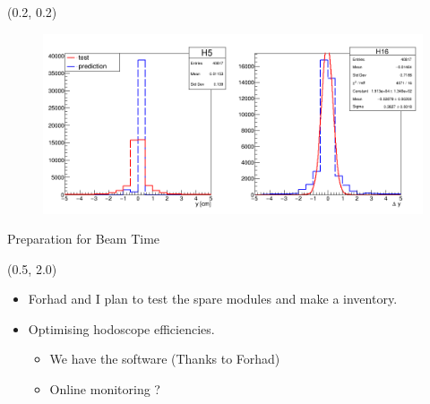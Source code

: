 \documentclass[12pt, xcolor={dvipsnames}, aspectratio = 169]{beamer}
\begin{document}
\begin{frame}

\begin{textblock}{14.0}(0.2, 0.2)
    \begin{figure}
        \centering
        \includegraphics[width=14.0cm]{../imgs/vty.png}
    \end{figure}
\end{textblock}

\end{frame}

\begin{frame}{Preparation for Beam Time}

\begin{textblock}{14.0}(0.5, 2.0)

\begin{itemize}

\item Forhad and I plan to test the spare modules and make a inventory.

\item Optimising hodoscope efficiencies.

\begin{itemize}
    \item We have the software (Thanks to Forhad)
    \item Online monitoring ?
\end{itemize}

\end{itemize}

\end{textblock}

\end{frame}
\end{document}

